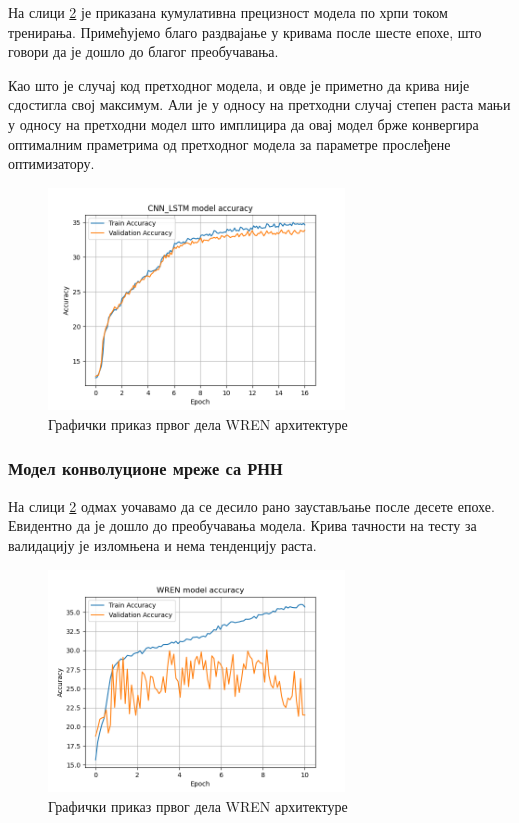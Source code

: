 \documentclass[a4paper, 12pt, master, utf8]{etf}
\begin{document}
На слици \ref{fig:mlpacc} је приказана кумулативна прецизност модела по хрпи током тренирања. Примећујемо благо раздвајање у кривама после шесте епохе, што говори да је дошло до благог преобучавања. 

Као што је случај код претходног модела, и овде је приметно да крива није сдостигла свој максимум. Али је у односу на претходни случај степен раста мањи у односу на претходни модел што 
имплицира да овај модел брже конвергира оптималним праметрима од претходног модела за параметре прослеђене оптимизатору.
\newline

\begin{figure}[H]
    \centering
    \includegraphics[width=0.7\textwidth]{../Results/CNN_LSTM_21_11_09/accuracy.png}
    \caption{Графички приказ првог дела WREN архитектуре}
    \label{fig:mlpacc}
\end{figure}

\subsubsection{Модел конволуционе мреже са РНН}

На слици \ref{fig:mlpacc} одмах уочавамо да се десило рано заустављање после десете епохе. Евидентно да је дошло до преобучавања модела.
Крива тачности на тесту за валидацију је изломњена и нема тенденцију раста.

\begin{figure}[H]
    \centering
    \includegraphics[width=0.7\textwidth]{../Results/WildRelationalNetwork_22_17_09/accuracy.png}
    \caption{Графички приказ првог дела WREN архитектуре}
    \label{fig:mlpacc}
\end{figure}
\end{document}
